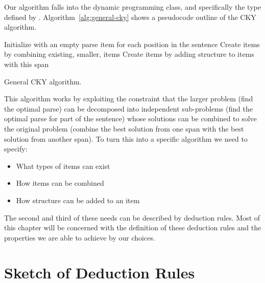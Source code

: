 Our algorithm falls into the dynamic programming class, and specifically the type defined by \textcite{Cocke:1969,Kasami:1966,Younger:1967}.
Algorithm~\ref{alg:general-cky} shows a pseudocode outline of the CKY algorithm.

\begin{algorithm}[t]
\centering
\begin{algorithmic}[]
  \State Initialize with an empty parse item for each position in the sentence
      \State Create items by combining existing, smaller, items
      \State Create items by adding structure to items with this span
    \EndFor
  \EndFor
\end{algorithmic}
\caption{\label{alg:general-cky}
General CKY algorithm.
}
\end{algorithm}

This algorithm works by exploiting the constraint that the larger problem (find the optimal parse) can be decomposed into independent sub-problems (find the optimal parse for part of the sentence) whose solutions can be combined to solve the original problem (combine the best solution from one span with the best solution from another span).
To turn this into a specific algorithm we need to specify:

\begin{itemize}
  \item What types of items can exist
  \item How items can be combined
  \item How structure can be added to an item
\end{itemize}

The second and third of these needs can be described by deduction rules.
Most of this chapter will be concerned with the definition of these deduction rules and the properties we are able to achieve by our choices.

\section{Sketch of Deduction Rules} \label{sec:sketch-of-rules}


\newlength\vertSmall
\newlength\vertBig
\newlength\vertBigger
\newlength{}
\newlength\coordGap

